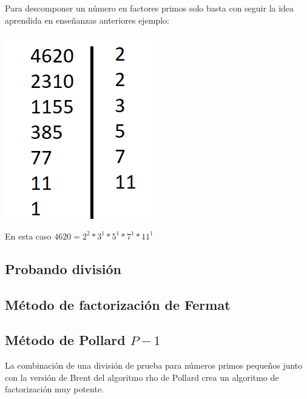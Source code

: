Para descomponer un número en factores primos solo basta con seguir la idea aprendida en enseñanzas anteriores ejemplo:

\includegraphics[scale=0.4]{img/descomposicion_primos}

En esta caso $4620=2^{2}*3^{1}*5^{1}*7^{1}*11^{1}$


\subsection{Probando división}


\subsection{Método de factorización de Fermat}


\subsection{Método de Pollard $P-1$}



La combinación de una división de prueba para números primos pequeños junto con la versión de Brent del algoritmo rho de Pollard crea un algoritmo de factorización muy potente.


